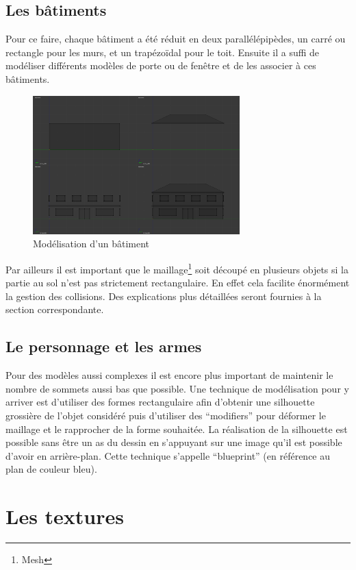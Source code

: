 \documentclass[11pt]{report}
\begin{document}
\subsection{Les bâtiments}

Pour ce faire, chaque bâtiment a été réduit en deux parallélépipèdes, un carré ou rectangle pour les murs, et un trapézoïdal pour le toit. Ensuite il a suffi de modéliser différents modèles de porte ou de fenêtre et de les associer à ces bâtiments.

\begin{figure}[htbp]
\centering
\includegraphics[width=8cm]{batiment.png}
\caption{Modélisation d'un bâtiment}
\end{figure}

Par ailleurs il est important que le maillage\footnote{Mesh} soit découpé en plusieurs objets si la partie au sol n'est pas strictement rectangulaire. En effet cela facilite énormément la gestion des collisions. Des explications plus détaillées seront fournies à la section correspondante.

\subsection{Le personnage et les armes}

Pour des modèles aussi complexes il est encore plus important de maintenir le nombre de sommets aussi bas que possible. Une technique de modélisation pour y arriver est d’utiliser des formes rectangulaire afin d’obtenir une silhouette grossière de l’objet considéré puis d’utiliser des ``modifiers'' pour déformer le maillage et le rapprocher de la forme souhaitée. La réalisation de la silhouette est possible sans être un as du dessin en s’appuyant sur une image qu’il est possible d’avoir en arrière-plan. Cette technique s’appelle ``blueprint'' (en référence au plan de couleur bleu).

\section{Les textures}
\end{document}
